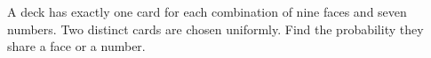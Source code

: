 A deck has exactly one card for each combination of nine faces and seven numbers. Two distinct cards are chosen uniformly. Find the probability they share a face or a number.
